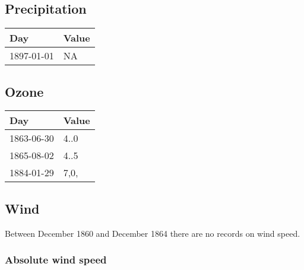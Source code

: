 \documentclass[]{article}
\begin{document}
\subsection{Precipitation}\label{precipitation}

\begin{longtable}[]{@{}ll@{}}
\toprule
Day & Value\tabularnewline
\midrule
\endhead
1897-01-01 & NA\tabularnewline
\bottomrule
\end{longtable}

\subsection{Ozone}\label{ozone}

\begin{longtable}[]{@{}ll@{}}
\toprule
Day & Value\tabularnewline
\midrule
\endhead
1863-06-30 & 4..0\tabularnewline
1865-08-02 & 4..5\tabularnewline
1884-01-29 & 7,0,\tabularnewline
\bottomrule
\end{longtable}

\subsection{Wind}\label{wind}

Between December 1860 and December 1864 there are no records on wind
speed.

\subsubsection{Absolute wind speed}\label{absolute-wind-speed}
\end{document}
